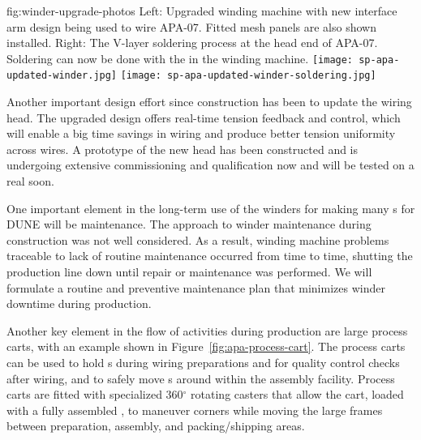 \begin{dunefigure}{fig:winder-upgrade-photos}
{Left: Upgraded winding machine with new interface arm design being used to wire APA-07. Fitted mesh panels are also shown installed. Right: The V-layer soldering process at the head end of APA-07. Soldering can now be done with the  in the winding machine.}
\texttt{[image: sp-apa-updated-winder.jpg]} 
\texttt{[image: sp-apa-updated-winder-soldering.jpg]}
\end{dunefigure}

Another important design effort since  construction has been to update the wiring head. The upgraded design offers real-time tension feedback and control, which will enable a big time savings in wiring and produce better tension uniformity across wires.  A prototype of the new head has been constructed and is undergoing extensive commissioning and qualification now and will be tested on a real  soon.     

One important element in the long-term use of the winders for making many s for DUNE will be maintenance.  The approach to winder maintenance during  construction was not well considered. As a result, winding machine problems traceable to lack of routine maintenance occurred from time to time, shutting the production line down until repair or maintenance was performed. We will formulate a routine and preventive maintenance plan that minimizes winder downtime during  production.

Another key element in the flow of activities during production are large process carts, with an example shown in Figure~\ref{fig:apa-process-cart}. The process carts can be used to hold s during wiring preparations and for quality control checks after wiring, and to safely move s around within the assembly facility. 
Process carts are fitted with specialized 360$^\circ$ rotating casters that allow the cart, loaded with a fully assembled , to maneuver corners while moving the large frames between preparation, assembly, and packing/shipping areas.


